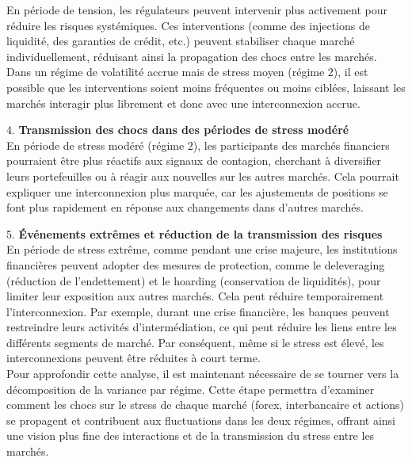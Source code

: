 En période de tension, les régulateurs peuvent intervenir plus activement pour réduire les risques systémiques. Ces interventions (comme des injections de liquidité, des garanties de crédit, etc.) peuvent stabiliser chaque marché individuellement, réduisant ainsi la propagation des chocs entre les marchés. \\
Dans un régime de volatilité accrue mais de stress moyen (régime 2), il est possible que les interventions soient moins fréquentes ou moins ciblées, laissant les marchés interagir plus librement et donc avec une interconnexion accrue.

\vspace{0.5cm}

4. \textbf{Transmission des chocs dans des périodes de stress modéré} \\

En période de stress modéré (régime 2), les participants des marchés financiers pourraient être plus réactifs aux signaux de contagion, cherchant à diversifier leurs portefeuilles ou à réagir aux nouvelles sur les autres marchés. Cela pourrait expliquer une interconnexion plus marquée, car les ajustements de positions se font plus rapidement en réponse aux changements dans d’autres marchés.

\vspace{0.5cm}

5. \textbf{Événements extrêmes et réduction de la transmission des risques} \\

En période de stress extrême, comme pendant une crise majeure, les institutions financières peuvent adopter des mesures de protection, comme le deleveraging (réduction de l’endettement) et le hoarding (conservation de liquidités), pour limiter leur exposition aux autres marchés. Cela peut réduire temporairement l’interconnexion. Par exemple, durant une crise financière, les banques peuvent restreindre leurs activités d'intermédiation, ce qui peut réduire les liens entre les différents segments de marché. Par conséquent, même si le stress est élevé, les interconnexions peuvent être réduites à court terme.\\

Pour approfondir cette analyse, il est maintenant nécessaire de se tourner vers la décomposition de la variance par régime. Cette étape permettra d'examiner comment les chocs sur le stress de chaque marché (forex, interbancaire et actions) se propagent et contribuent aux fluctuations dans les deux régimes, offrant ainsi une vision plus fine des interactions et de la transmission du stress entre les marchés.

